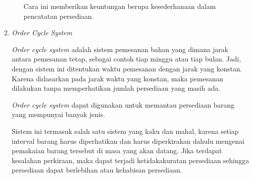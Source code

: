 \begin{enumerate}
\begin{enumerate}
		Cara ini memberikan keuntungan berupa kesederhanaan dalam pencatatan persediaan.
	\end{enumerate}

	\item \textit{Order Cycle System}
	
	\textit{Order cycle system} adalah sistem pemesanan bahan yang dimana jarak antara pemesanan tetap, sebagai contoh tiap minggu atau tiap bulan. Jadi, dengan sistem ini ditentukan waktu pemesanan dengan jarak yang konstan. Karena didasarkan pada jarak waktu yang konstan, maka pemesanan dilakukan tanpa memperhatikan jumlah persediaan yang masih ada.

	\textit{Order cycle system} dapat digunakan untuk memantau persediaan barang yang mempunyai banyak jenis.

	Sistem ini termasuk salah satu sistem yang kaku dan mahal, karena setiap interval barang harus diperhatikan dan harus diperkirakan dahulu mengenai pemakaian barang tersebut di masa yang akan datang. Jika terdapat kesalahan perkiraan, maka dapat terjadi ketidakakuratan persediaan sehingga persediaan dapat berlebihan atau kehabisan persediaan.
\end{enumerate}










